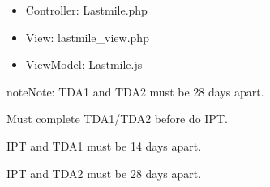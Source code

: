 \documentclass[letterpaper,10pt,english,openany,oneside]{sphinxmanual}
\begin{document}
\begin{sphinxVerbatim}[commandchars=\\\{\}]
                                                   
                                                   
                            
                                                            
                                
                                                            
                            
\end{sphinxVerbatim}
\begin{itemize}
\item {} 
\sphinxAtStartPar
Controller: Lastmile.php

\item {} 
\sphinxAtStartPar
View: lastmile\_view.php

\item {} 
\sphinxAtStartPar
ViewModel: Lastmile.js

\end{itemize}

\begin{sphinxadmonition}{note}{Note:}
\sphinxAtStartPar
TDA1 and TDA2 must be 28 days apart.

\sphinxAtStartPar
Must complete TDA1/TDA2 before do IPT.

\sphinxAtStartPar
IPT and TDA1 must be 14 days apart.

\sphinxAtStartPar
IPT and TDA2 must be 28 days apart.
\end{sphinxadmonition}
\end{document}

